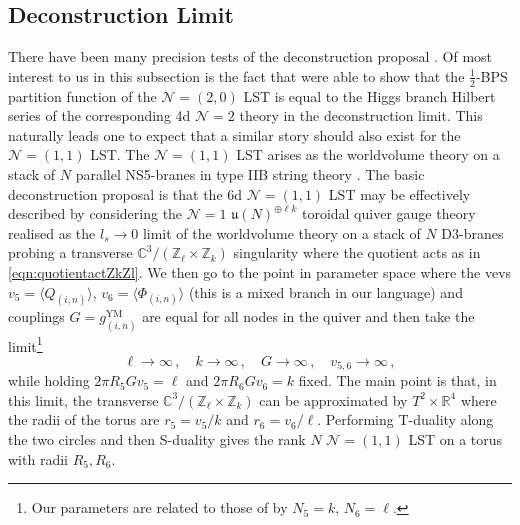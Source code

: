 \documentclass[main.tex]{subfiles}
\begin{document}
\subsection{Deconstruction Limit}
There have been many precision tests \cite{Hayling:2017cva,Hayling:2018fmv,Hayling:2018fgy,Lambert:2012qy} of the deconstruction proposal \cite{ArkaniHamed:2001ie}. Of most interest to us in this subsection is the fact that \cite{Hayling:2017cva,Bourget:2017sxr} were able to show that the $\frac{1}{2}$-BPS partition function of the $\mathcal{N}=(2,0)$ LST is equal to the Higgs branch Hilbert series of the corresponding 4d $\mathcal{N}=2$ theory in the deconstruction limit. This naturally leads one to expect that a similar story should also exist for the $\mathcal{N}=(1,1)$ LST. The $\mathcal{N}=(1,1)$ LST arises as the worldvolume theory on a stack of $N$ parallel NS5-branes in type IIB string theory \cite{Giveon:1999zm,Aharony:1998ub,Seiberg:1997zk,Berkooz:1997cq,Aharony:1999ks}. 
The basic deconstruction proposal is that the 6d $\mathcal{N}=(1,1)$ LST may be effectively described by considering the $\mathcal{N}=1$ $\mathfrak{u}(N)^{\oplus\ell k}$ toroidal quiver gauge theory realised as the $l_s\to0$ limit of the worldvolume theory on a stack of $N$ D3-branes probing a transverse $\mathbb{C}^3/(\mathbb{Z}_{\ell}\times\mathbb{Z}_k)$ singularity where the quotient acts as in \eqref{eqn:quotientactZkZl}.
We then go to the point in parameter space where the vevs $v_5=\langle Q_{(i,n)}\rangle$, $v_6=\langle \Phi_{(i,n)}\rangle$ (this is a mixed branch in our language) and couplings $G=g^{\text{YM}}_{(i,n)}$ are equal for all nodes in the quiver and then take the limit\footnote{Our parameters are related to those of \cite{ArkaniHamed:2001ie} by $N_5=k$, $N_6=\ell$.}
\begin{equation}
\quad\ell\to\infty\,,\quad k\to\infty\,,\quad G\to\infty\,,\quad v_{5,6}\to\infty\,,\quad 
\end{equation}
while holding $2\pi R_5 Gv_5=\ell$ and $2\pi R_6 Gv_6=k$ fixed. The main point is that, in this limit, the transverse $\mathbb{C}^3/(\mathbb{Z}_{\ell}\times\mathbb{Z}_k)$ can be approximated by $T^2\times\mathbb{R}^4$ where the radii of the torus are $r_{5}=v_5/k$ and $r_6=v_6/\ell$. Performing T-duality along the two circles and then S-duality gives the rank $N$ $\mathcal{N}=(1,1)$ LST on a torus with radii $R_5,R_6$.
\end{document}
